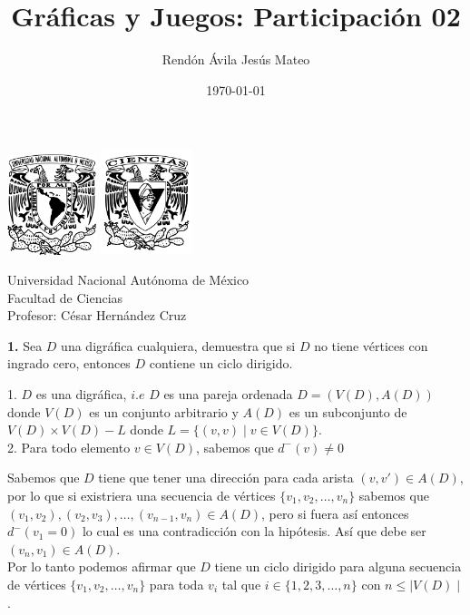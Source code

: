 \documentclass[12pt]{article}
\title{\textbf{Gráficas y Juegos: Participación 02}}
\author{Rendón Ávila Jesús Mateo}
\date{\today}
\begin{document}
\maketitle
\begin{center}
\vspace{3cm}
\includegraphics[width=0.195\textwidth]{Escudo.png}
\hspace{0.5cm}
\includegraphics[width=0.2\textwidth]{logo_ciencias.png}
\end{center}
\begin{center}
    \vspace{1cm}
    Universidad Nacional Autónoma de México\\
    Facultad de Ciencias\\
    Profesor: César Hernández Cruz\\
\end{center}

\newpage

%
%
\textbf{1.} Sea $D$ una digráfica cualquiera, demuestra que si $D$ no tiene vértices con ingrado cero, entonces $D$ contiene un ciclo dirigido.

\begin{tcolorbox}[title=\textbf{Hipotesis}, colback=red!15!white, colframe=black!]
    1. $D$ es una digráfica, $i.e$ $D$ es una pareja ordenada $D = (V(D), A(D))$ donde $V(D)$ es un conjunto arbitrario y $A(D)$ es un subconjunto de $V(D) \times V(D) - L$ 
    donde $L = \{(v,v) \mid v \in V(D)\}$.\\

    2. Para todo elemento $v \in V(D)$, sabemos que $d^-(v) \neq 0$
\end{tcolorbox}

Sabemos que $D$ tiene que tener una dirección para cada arista $(v, v') \in A(D)$, por lo que si existriera una secuencia de vértices
$\{v_1, v_2, \ldots, v_n\}$ sabemos que $(v_1, v_2), (v_2, v_3), \ldots, (v_{n-1}, v_n) \in A(D)$, pero si fuera así entonces 
$d^-(v_1 = 0)$ lo cual es una contradicción con la hipótesis. Así que debe ser $(v_n, v_1) \in A(D)$.\\

Por lo tanto podemos afirmar que $D$ tiene un ciclo dirigido para alguna secuencia de vértices $\{v_1, v_2, \ldots, v_n\}$ para toda $v_i$ tal que $i \in \{1, 2, 3, \ldots, n\}$
con $n \leq \mid V(D) \mid$.
\end{document}
